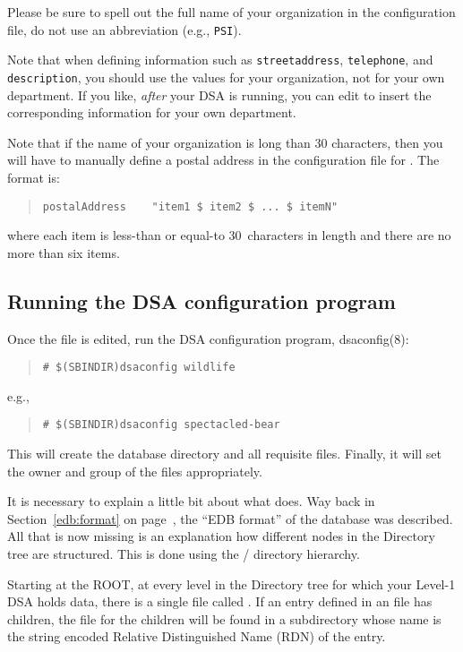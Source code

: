Please be sure to spell out the full name of your organization in the 
configuration file,
do not use an abbreviation (e.g., \verb"PSI").

Note that when defining information such as \verb"streetaddress",
\verb"telephone",
and \verb"description", you should use the values for your organization,
not for your own department.
If you like,
{\em after\/} your DSA is running,
you can edit  to insert the corresponding
information for your own department.

Note that if the name of your organization is long than 30 characters,
then you will have to manually define a postal address in the configuration
file for .
The format is:
\begin{quote}\small\begin{verbatim}
postalAddress    "item1 $ item2 $ ... $ itemN"
\end{verbatim}\end{quote}
where each item is less-than or equal-to 30~characters in length and there are
no more than six items.

\subsection	{Running the DSA configuration program}
Once the file is edited,
run the DSA configuration program, \man dsaconfig(8):
\begin{quote}\small\begin{verbatim}
# $(SBINDIR)dsaconfig wildlife
\end{verbatim}\end{quote}
e.g.,
\begin{quote}\small\begin{verbatim}
# $(SBINDIR)dsaconfig spectacled-bear
\end{verbatim}\end{quote}
This will create the database directory and all requisite files.
Finally,
it will set the owner and group of the files appropriately.

It is necessary to explain a little bit about what  does.
Way back in Section~\ref{edb:format} on page~\pageref{edb:format},
the ``EDB format'' of the database was described.
All that is now missing is an explanation how different nodes in the Directory
tree are structured.
This is done using the \unix/ directory hierarchy.

Starting at the ROOT,
at every level in the Directory tree for which your Level-1 DSA holds data,
there is a single file called .
If an entry defined in an  file has children,
the  file for the children will be found in a subdirectory
whose name is the string encoded Relative Distinguished Name (RDN) of
the entry.

